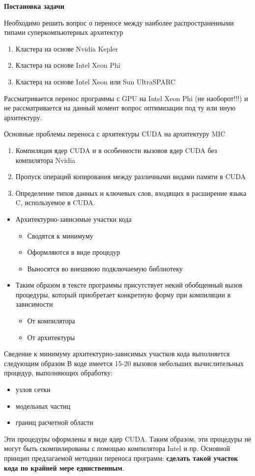 \textbf{Постановка задачи}

Необходимо решить вопрос о переносе между наиболее распространенными типами суперкомпьютерных архитектур
\begin{enumerate}
	\item Кластера на основе Nvidia Kepler 
	\item Кластера на основе Intel Xeon Phi
	\item Кластера на основе Intel Xeon или Sun UltraSPARC
\end{enumerate}
Рассматривается перенос программы с GPU на Intel Xeon Phi (не наоборот!!!) и не рассматривается на данный момент вопрос оптимизации под ту или иную архитектуру.

Основные проблемы переноса с архитектуры CUDA\cite{CUDAweb,Boreskov,Sanders} на архитектуру MIC\cite{MorganPhi,FangPhi2014}
\begin{enumerate}
	\item Компиляция ядер CUDA 
	и в особенности вызовов ядер CUDA без компилятора Nvidia
	\item Пропуск операций копирования между различными видами памяти в CUDA
	\item Определение типов данных и ключевых слов, входящих в расширение языка C, используемое в CUDA.
\end{enumerate}


\begin{itemize}
	\item Архитектурно-зависимые участки кода 
	\begin{itemize}
		\item Сводятся к минимуму
		\item Оформляются в виде процедур 
		\item Выносятся во внешнюю подключаемую библиотеку
	\end{itemize}
	\item Таким образом в тексте программы присутствует некий обобщенный вызов процедуры, который приобретает конкретную форму при компиляции в зависимости
	\begin{itemize}
		\item От компилятора
		\item От архитектуры
	\end{itemize}
\end{itemize}

Сведение к минимуму архитектурно-зависимых участков кода выполняется следующим образом 
В коде имеется 15-20 вызовов небольших вычислительных процедур, 
выполняющих обработку:
\begin{itemize}
	\item узлов сетки
	\item модельных частиц
	\item границ расчетной области
\end{itemize}
Эти процедуры оформлены в виде ядер CUDA. Таким образом, эти процедуры не могут быть скомпилированы с помощью компилятора Intel и пр.
Основной принцип предлагаемой методики переноса программ: \textbf{сделать такой участок кода по крайней мере единственным}.

